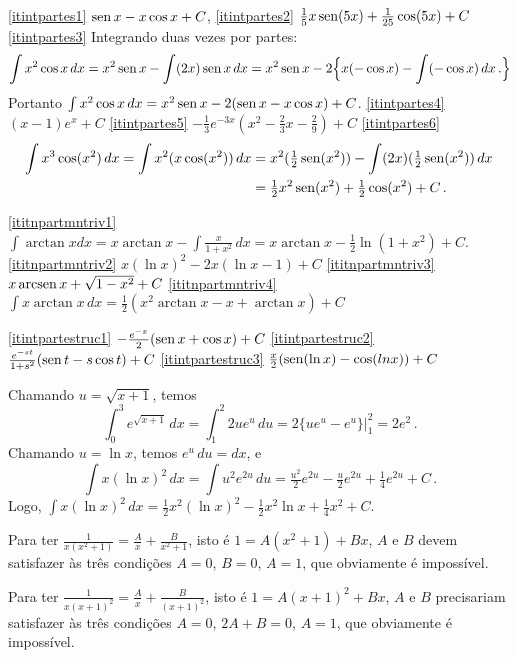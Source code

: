 \begin{Solution}{9.17}
\eqref{itintpartes1} $\operatorname{sen} x-x\cos x+C$,
\eqref{itintpartes2} $\frac{1}{5}x\operatorname{sen}(5x)+\frac{1}{25}\cos(5x)+C$
\eqref{itintpartes3} Integrando duas vezes por partes:
$$
\int x^2\cos x\,dx=x^2\operatorname{sen} x-\int (2x)\operatorname{sen} x\,dx=x^2\operatorname{sen} x-2\Bigl\{
x(-\cos x)-\int (-\cos x)\,dx\,.
\Bigr\}$$
Portanto $\int x^2\cos x\,dx=x^2\operatorname{sen} x-2(\operatorname{sen} x-x\cos x)+C$.
\eqref{itintpartes4} $(x-1)e^x+C$
\eqref{itintpartes5} $-\tfrac13 e^{-3x}(x^2-\tfrac23 x-\tfrac29)+C$
\eqref{itintpartes6}
\begin{align*}
\int x^3\cos (x^2)\,dx=\int x^2 (x\cos(x^2))\,dx&=x^2(\tfrac12
\operatorname{sen}(x^2))-\int(2x)(\tfrac12 \operatorname{sen} (x^2))\,dx\,\\
&=\tfrac12 x^2 \operatorname{sen}(x^2)+\tfrac12 \cos (x^2)+C\,.
\end{align*}
\end{Solution}
\begin{Solution}{9.18}
 \eqref{ititnpartmntriv1}
$\int \arctan x dx=x\arctan
x-\int\frac{x}{1+x^2}\,dx=x\arctan x-\tfrac12 \ln (1+x^2)+C$.
\eqref{ititnpartmntriv2} $x(\ln x)^2-2x(\ln x-1)+C$
\eqref{ititnpartmntriv3} $x\operatorname{arcsen} x+\sqrt{1-x^2}+C$
\eqref{ititnpartmntriv4} $\int x\arctan x\,dx=\frac12(x^2\arctan x-x+\arctan x)+C$
\end{Solution}
\begin{Solution}{9.19}
\eqref{itintpartestruc1} $-\frac{e^{-x}}{2}(\operatorname{sen} x+\cos x)+C$
\eqref{itintpartestruc2} $\frac{e^{-st}}{1+s^2}(\operatorname{sen} t- s\cos t)+C$
\eqref{itintpartestruc3} $\frac{x}{2}(\operatorname{sen} (\ln x)-\cos (ln x))+C$
\end{Solution}
\begin{Solution}{9.20}
Chamando $u=\sqrt{x+1}$, temos
$$
\int_0^3e^{\sqrt{x+1}}\,dx=\int_1^2
2ue^u\,du=2\bigl\{ue^u-e^u\bigr\}\big|_1^2=2e^2\,.
$$
Chamando $u=\ln x$, temos $e^u\,du=dx$, e
$$
\int x(\ln x)^2\,dx=\int
u^2e^{2u}\,du=\tfrac{u^2}{2}e^{2u}-\tfrac{u}{2}e^{2u}+\tfrac14 e^{2u}+C\,.
$$
Logo, $\int x(\ln x)^2\,dx=\tfrac12 x^2(\ln x)^2-\tfrac12 x^2\ln
x+\tfrac14x^2+C$.
\end{Solution}
\begin{Solution}{9.21}
Para ter $\frac{1}{x(x^2+1)}=\frac{A}{x}+\frac{B}{x^2+1}$, isto é
$1=A(x^2+1)+Bx$, $A$ e $B$
devem satisfazer às três condições $A=0$, $B=0$, $A=1$, que obviamente é
impossível.
\end{Solution}
\begin{Solution}{9.22}
Para ter $\frac{1}{x(x+1)^2}=\frac{A}{x}+\frac{B}{(x+1)^2}$, isto é
$1=A(x+1)^2+Bx$, $A$ e $B$ precisariam satisfazer às três condições $A=0$,
$2A+B=0$, $A=1$, que obviamente é impossível.
\end{Solution}
